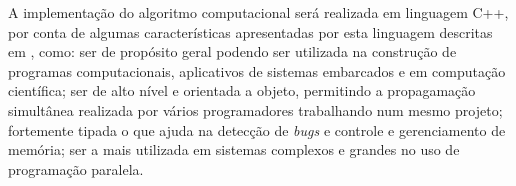 A implementa\c{c}\~ao do algoritmo computacional ser\'a realizada em linguagem C++, por conta de algumas caracter\'isticas apresentadas por esta linguagem descritas em \cite{bueno_2015}, como: ser de prop\'osito geral podendo ser utilizada na constru\c{c}\~ao de programas computacionais, aplicativos de sistemas embarcados e em computa\c{c}\~ao cient\'ifica; ser de alto n\'ivel e orientada a objeto, permitindo a propagama\c{c}\~ao simult\^anea realizada por v\'arios programadores trabalhando num mesmo projeto; fortemente tipada o que ajuda na detec\c{c}\~ao de \textit{bugs} e controle e gerenciamento de mem\'oria; ser a mais utilizada em sistemas complexos e grandes no uso de programa\c{c}\~ao paralela.